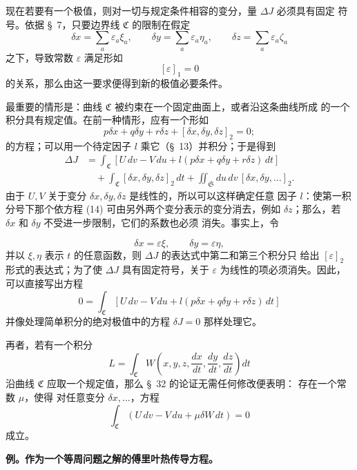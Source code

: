 \documentclass[11pt,a4paper,leqno]{article}
\begin{document}
现在若要有一个极值，则对一切与规定条件相容的变分，量 $\Delta J$ 必须具有固定
符号。依据 \S~7，只要边界线 $\mathfrak{C}$ 的限制在假定
\[
\delta x=\sum_a\varepsilon_a\xi_a,\qquad
\delta y=\sum_a\varepsilon_a\eta_a,\qquad
\delta z=\sum_a\varepsilon_a\zeta_a
\]
之下，导致常数 $\varepsilon$ 满足形如
\[
[\varepsilon]_1=0
\]
的关系，那么由这一要求便得到新的极值必要条件。

最重要的情形是：曲线 $\mathfrak{C}$ 被约束在一个固定曲面上，或者沿这条曲线所成
的一个积分具有规定值。在前一种情形，应有一个形如
\begin{equation}\tag{14}
p\delta x+q\delta y+r\delta z+[\delta x,\delta y,\delta z]_2=0;
\end{equation}
的方程；可以用一个待定因子 $l$ 乘它（\S~13）并积分；于是得到
\[
\begin{aligned}
\Delta J
&=\int_{\mathfrak{C}}
[U\,dv-V\,du+l(p\delta x+q\delta y+r\delta z)\,dt]\\
&\quad+\int_{\mathfrak{C}}[\delta x,\delta y,\delta z]_2\,dt
+\iint_{\mathfrak{S}}du\,dv\,[\delta x,\delta y,\ldots]_2.
\end{aligned}
\]
由于 $U,V$ 关于变分 $\delta x,\delta y,\delta z$ 是线性的，所以可以这样确定任意
因子 $l$：使第一积分号下那个依方程 (14) 可由另外两个变分表示的变分消去，例如
$\delta z$；那么，若 $\delta x$ 和 $\delta y$ 不受进一步限制，它们的系数也必须
消失。事实上，令

\[
\delta x=\varepsilon\xi,\qquad \delta y=\varepsilon\eta,
\]
并以 $\xi,\eta$ 表示 $t$ 的任意函数，则 $\Delta J$ 的表达式中第二和第三个积分只
给出 $[\varepsilon]_2$ 形式的表达式；为了使 $\Delta J$ 具有固定符号，关于
$\varepsilon$ 为线性的项必须消失。因此，可以直接写出方程
\begin{equation}\tag{15}
0=\int_{\mathfrak{C}}
[U\,dv-V\,du+l(p\delta x+q\delta y+r\delta z)\,dt]
\end{equation}
并像处理简单积分的绝对极值中的方程 $\delta J=0$ 那样处理它。

再者，若有一个积分
\[
L=\int_{\mathfrak{C}}
W\left(x,y,z,\frac{dx}{dt},\frac{dy}{dt},\frac{dz}{dt}\right)dt
\]
沿曲线 $\mathfrak{C}$ 应取一个规定值，那么 \S~32 的论证无需任何修改便表明：
存在一个常数 $\mu$，使得
对任意变分 $\delta x,\ldots$，方程
\[
\int_{\mathfrak{C}}(U\,dv-V\,du+\mu\delta W\,dt)=0
\]
成立。

\begin{center}
\textbf{例。作为一个等周问题之解的傅里叶热传导方程。}
\end{center}
\end{document}
